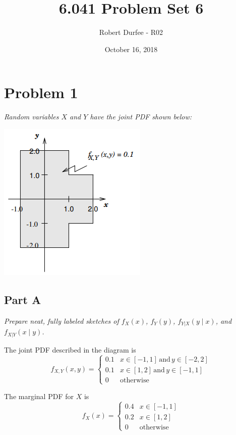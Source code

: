 \documentclass{article}
\title{6.041 Problem Set 6}
\author{Robert Durfee - R02}
\date{October 16, 2018}
\begin{document}
\maketitle

\section*{Problem 1}

\textit{Random variables $X$ and $Y$ have the joint PDF shown below:}

\begin{center}
    \includegraphics[scale=1]{Images/P1.PNG}
\end{center}

\subsection*{Part A}

\textit{Prepare neat, fully labeled sketches of $f_X(x)$, $f_Y(y)$,
$f_{Y|X}(y \mid x)$, and $f_{X|Y}(x \mid y)$.}

\bigbreak

The joint PDF described in the diagram is
$$ f_{X,Y}(x, y) = \begin{cases}
    0.1 & x \in [-1, 1]\, \mathrm{and}\, y \in [-2, 2] \\
    0.1 & x \in [1, 2]\, \mathrm{and}\, y \in [-1, 1] \\
    0 & \mathrm{otherwise}
\end{cases} $$

The marginal PDF for $X$ is
$$ f_X(x) = \begin{cases}
    0.4 & x \in [-1, 1] \\
    0.2 & x \in [1, 2] \\
    0 & \mathrm{otherwise}
\end{cases} $$
\end{document}

